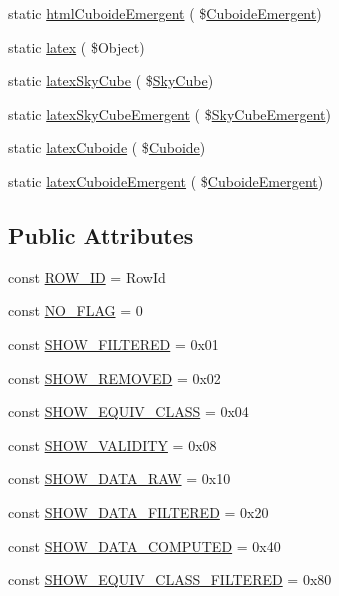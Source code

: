 \begin{DoxyCompactItemize}
\item 
static \hyperlink{class_s_k_display_a063cc1eec4ae734ab5592b7422887fb3}{html\+Cuboide\+Emergent} ( \$\hyperlink{class_cuboide_emergent}{Cuboide\+Emergent})
\item 
static \hyperlink{class_s_k_display_ab255199272d9ee09153b83da5827c6b4}{latex} ( \$Object)
\item 
static \hyperlink{class_s_k_display_aefa8be0cd6ef68f76d974531cd7d0d83}{latex\+Sky\+Cube} ( \$\hyperlink{class_sky_cube}{Sky\+Cube})
\item 
static \hyperlink{class_s_k_display_ab294596804a852aff33a6ae4c43b824a}{latex\+Sky\+Cube\+Emergent} ( \$\hyperlink{class_sky_cube_emergent}{Sky\+Cube\+Emergent})
\item 
static \hyperlink{class_s_k_display_a97e010c8dd0ece888953d591da09457f}{latex\+Cuboide} ( \$\hyperlink{class_cuboide}{Cuboide})
\item 
static \hyperlink{class_s_k_display_abd02d55d8d7314afbfbf241ef6f72126}{latex\+Cuboide\+Emergent} ( \$\hyperlink{class_cuboide_emergent}{Cuboide\+Emergent})
\end{DoxyCompactItemize}
\subsection*{Public Attributes}
\begin{DoxyCompactItemize}
\item 
const \hyperlink{class_s_k_display_ab09ad75f16801950bf6f604d57789ca0}{R\+O\+W\+\_\+\+ID} = \textquotesingle{}Row\+Id\textquotesingle{}
\item 
const \hyperlink{class_s_k_display_af2dee15e686662e84c1ed49370266f49}{N\+O\+\_\+\+F\+L\+AG} = 0
\item 
const \hyperlink{class_s_k_display_a76b4f1df0ee307907d0b7585e8acca26}{S\+H\+O\+W\+\_\+\+F\+I\+L\+T\+E\+R\+ED} = 0x01
\item 
const \hyperlink{class_s_k_display_a0c636ff1c2464c600850d5d28e10df32}{S\+H\+O\+W\+\_\+\+R\+E\+M\+O\+V\+ED} = 0x02
\item 
const \hyperlink{class_s_k_display_a479b2239e8fdf16b7cc0dc2f4f386d69}{S\+H\+O\+W\+\_\+\+E\+Q\+U\+I\+V\+\_\+\+C\+L\+A\+SS} = 0x04
\item 
const \hyperlink{class_s_k_display_a0cf8f3d0a6775fa219d9c8fc5ba84912}{S\+H\+O\+W\+\_\+\+V\+A\+L\+I\+D\+I\+TY} = 0x08
\item 
const \hyperlink{class_s_k_display_a4570f138181e66ba3f3b1f5de6b49f07}{S\+H\+O\+W\+\_\+\+D\+A\+T\+A\+\_\+\+R\+AW} = 0x10
\item 
const \hyperlink{class_s_k_display_acb8fad25cede2becfad3753dfc89eb7b}{S\+H\+O\+W\+\_\+\+D\+A\+T\+A\+\_\+\+F\+I\+L\+T\+E\+R\+ED} = 0x20
\item 
const \hyperlink{class_s_k_display_abcb5f59346d09d3507e03444dd82d004}{S\+H\+O\+W\+\_\+\+D\+A\+T\+A\+\_\+\+C\+O\+M\+P\+U\+T\+ED} = 0x40
\item 
const \hyperlink{class_s_k_display_aaa3189f31f22a2b1f23a47c1bcdf2337}{S\+H\+O\+W\+\_\+\+E\+Q\+U\+I\+V\+\_\+\+C\+L\+A\+S\+S\+\_\+\+F\+I\+L\+T\+E\+R\+ED} = 0x80
\end{DoxyCompactItemize}
